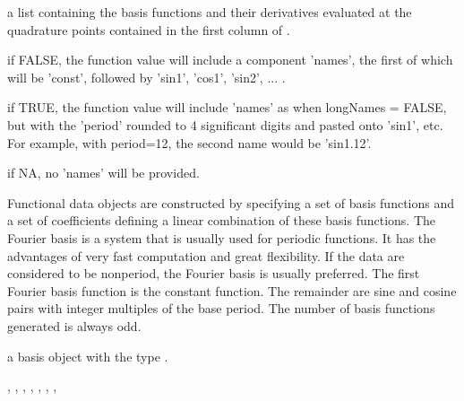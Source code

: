 \documentclass{article}
\begin{document}
\begin{Arguments}
\begin{ldescription}
\item[\code{values}] a list containing the basis functions and their derivatives
evaluated at the quadrature points contained in the first
column of .

\item[\code{longNames}] if FALSE, the function value will include a component 'names', the
first of which will be 'const', followed by 'sin1', 'cos1', 'sin2',
... . 

if TRUE, the function value will include 'names' as when longNames =
FALSE, but with the 'period' rounded to 4 significant digits and
pasted onto 'sin1', etc.  For example, with period=12, the second
name would be 'sin1.12'.

if NA, no 'names' will be provided.      

\end{ldescription}
\end{Arguments}
\begin{Details}\relax
Functional data objects are constructed by specifying a set of basis
functions and a set of coefficients defining a linear combination of
these basis functions.  The Fourier basis is a system
that is usually used for periodic functions.  It has the advantages
of very fast computation and great flexibility.   If the data are
considered to be nonperiod, the Fourier basis is usually preferred.
The first Fourier basis function is the constant function.  The
remainder are sine and cosine pairs with integer multiples of the
base period. The number of basis functions generated is always odd.
\end{Details}
\begin{Value}
a basis object with the type .
\end{Value}
\begin{SeeAlso}\relax
{}, 
, 
, 
, 
, 
, 
, 
\end{SeeAlso}
\end{document}
